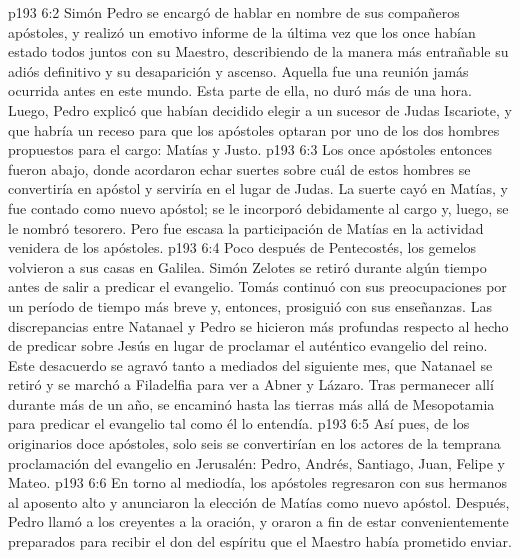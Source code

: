 \vs p193 6:2 Simón Pedro se encargó de hablar en nombre de sus compañeros apóstoles, y realizó un emotivo informe de la última vez que los once habían estado todos juntos con su Maestro, describiendo de la manera más entrañable su adiós definitivo y su desaparición y ascenso. Aquella fue una reunión jamás ocurrida antes en este mundo. Esta parte de ella, no duró más de una hora. Luego, Pedro explicó que habían decidido elegir a un sucesor de Judas Iscariote, y que habría un receso para que los apóstoles optaran por uno de los dos hombres propuestos para el cargo: Matías y Justo.
\vs p193 6:3 Los once apóstoles entonces fueron abajo, donde acordaron echar suertes sobre cuál de estos hombres se convertiría en apóstol y serviría en el lugar de Judas. La suerte cayó en Matías, y fue contado como nuevo apóstol; se le incorporó debidamente al cargo y, luego, se le nombró tesorero. Pero fue escasa la participación de Matías en la actividad venidera de los apóstoles.
\vs p193 6:4 \pc Poco después de Pentecostés, los gemelos volvieron a sus casas en Galilea. Simón Zelotes se retiró durante algún tiempo antes de salir a predicar el evangelio. Tomás continuó con sus preocupaciones por un período de tiempo más breve y, entonces, prosiguió con sus enseñanzas. Las discrepancias entre Natanael y Pedro se hicieron más profundas respecto al hecho de predicar sobre Jesús en lugar de proclamar el auténtico evangelio del reino. Este desacuerdo se agravó tanto a mediados del siguiente mes, que Natanael se retiró y se marchó a Filadelfia para ver a Abner y Lázaro. Tras permanecer allí durante más de un año, se encaminó hasta las tierras más allá de Mesopotamia para predicar el evangelio tal como él lo entendía.
\vs p193 6:5 Así pues, de los originarios doce apóstoles, solo seis se convertirían en los actores de la temprana proclamación del evangelio en Jerusalén: Pedro, Andrés, Santiago, Juan, Felipe y Mateo.
\vs p193 6:6 \pc En torno al mediodía, los apóstoles regresaron con sus hermanos al aposento alto y anunciaron la elección de Matías como nuevo apóstol. Después, Pedro llamó a los creyentes a la oración, y oraron a fin de estar convenientemente preparados para recibir el don del espíritu que el Maestro había prometido enviar.
